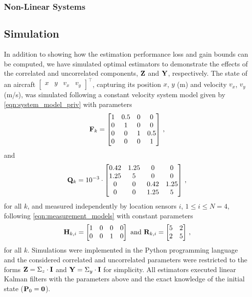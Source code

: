 \subsubsection{Non-Linear Systems}

% 
% 
\subsection{Simulation}\label{subsec:priv_estimation:fus_simulation}
In addition to showing how the estimation performance loss and gain bounds can be computed, we have simulated optimal estimators to demonstrate the effects of the correlated and uncorrelated components, ${{\mathbf{Z}}}$ and ${{\mathbf{Y}}}$, respectively. The state of an aircraft $\begin{bmatrix}x & y & v_x & v_y\end{bmatrix}^\top$, capturing its position $x$, $y$ (m) and velocity $v_x$, $v_y$ (m/s), was simulated following a constant velocity system model given by \eqref{eqn:system_model_priv} with parameters
\begin{equation}
  {\ensuremath{{\mathbf{F}}}}_k=
  \begin{bmatrix}
     1 & 0.5 & 0 & 0\\
     0 & 1 & 0 & 0\\
     0 & 0 & 1 & 0.5\\
     0 & 0 & 0 & 1
  \end{bmatrix}\,,
\end{equation}
and
\begin{equation}
  {\ensuremath{{\mathbf{Q}}}}_k=10^{-3}\cdot
  \begin{bmatrix}
     0.42 & 1.25 & 0 & 0\\
     1.25 & 5 & 0 & 0\\
     0 & 0 & 0.42 & 1.25\\
     0 & 0 & 1.25 & 5
  \end{bmatrix}\,,
\end{equation}
for all $k$, and measured independently by location sensors $i$, $1\leq i \leq N=4$, following \eqref{eqn:measurement_models} with constant parameters
\begin{equation}
  {\ensuremath{{\mathbf{H}}}}_{k,i}=
  \begin{bmatrix}
     1 & 0 & 0 & 0\\
     0 & 0 & 1 & 0
  \end{bmatrix}
  \text{ and }
  {\ensuremath{{\mathbf{R}}}}_{k,i}=
  \begin{bmatrix}
     5 & 2\\
     2 & 5
  \end{bmatrix}\,,
\end{equation}
for all $k$. Simulations were implemented in the Python programming language and the considered correlated and uncorrelated parameters were restricted to the forms ${{\mathbf{Z}}}=\Sigma_z\cdot{\ensuremath{{\mathbf{I}}}}$ and ${{\mathbf{Y}}}=\Sigma_y\cdot{\ensuremath{{\mathbf{I}}}}$ for simplicity. All estimators executed linear Kalman filters with the parameters above and the exact knowledge of the initial state (${{\mathbf{P}}}_0={{\mathbf{0}}}$).

